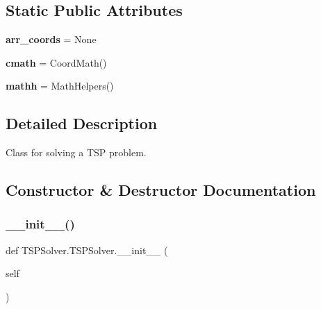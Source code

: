 \subsection*{Static Public Attributes}
\begin{DoxyCompactItemize}
\item 
\mbox{\label{classTSPSolver_1_1TSPSolver_aed9043a528c81230a7394a4dd1884c28}} 
{\bfseries arr\+\_\+coords} = None
\item 
\mbox{\label{classTSPSolver_1_1TSPSolver_a27776b599c1c3dedda84bbc5eb58b58b}} 
{\bfseries cmath} = Coord\+Math()
\item 
\mbox{\label{classTSPSolver_1_1TSPSolver_a3d89cf533e950e67471ef1407c4c5c5a}} 
{\bfseries mathh} = Math\+Helpers()
\end{DoxyCompactItemize}


\subsection{Detailed Description}
Class for solving a T\+SP problem. 



\subsection{Constructor \& Destructor Documentation}
\mbox{\label{classTSPSolver_1_1TSPSolver_abf7f291bbc7705ba2661f297adce9dfc}} 
\subsubsection{\texorpdfstring{\+\_\+\+\_\+init\+\_\+\+\_\+()}{\_\_init\_\_()}}
{\footnotesize\ttfamily def T\+S\+P\+Solver.\+T\+S\+P\+Solver.\+\_\+\+\_\+init\+\_\+\+\_\+ (\begin{DoxyParamCaption}\item[{}]{self }\end{DoxyParamCaption})}



